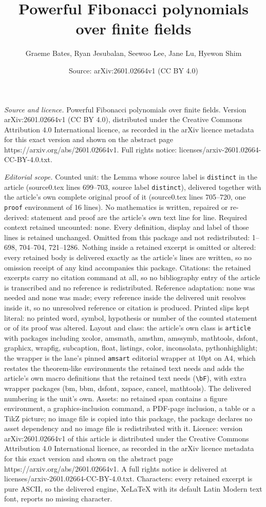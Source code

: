 \documentclass[10pt,a4paper]{amsart}
\title[Powerful Fibonacci polynomials over finite fields]{Powerful Fibonacci polynomials over finite fields}
\author{Graeme Bates, Ryan Jesubalan, Seewoo Lee, Jane Lu, Hyewon Shim}
\date{Source: arXiv:2601.02664v1 (CC BY 4.0)}
\begin{document}
\maketitle

\noindent\emph{Source and licence.} Powerful Fibonacci polynomials over finite fields. Version arXiv:2601.02664v1 (CC BY 4.0), distributed under the Creative Commons Attribution 4.0 International licence, as recorded in the arXiv licence metadata for this exact version and shown on the abstract page https://arxiv.org/abs/2601.02664v1. Full rights notice: licenses/arxiv-2601.02664-CC-BY-4.0.txt.\par\smallskip

\noindent\textit{Editorial scope.} Counted unit: the Lemma whose source label is \texttt{distinct} in the article (source0.tex lines 699--703, source label \texttt{distinct}), delivered together with the article's own complete original proof of it (source0.tex lines 705--720, one \texttt{proof} environment of 16 lines). No mathematics is written, repaired or re-derived: statement and proof are the article's own text line for line. Required context retained uncounted: none. Every definition, display and label of those lines is retained unchanged. Omitted from this package and not redistributed: 1--698, 704--704, 721--1286. Nothing inside a retained excerpt is omitted or altered: every retained body is delivered exactly as the article's lines are written, so no omission receipt of any kind accompanies this package. Citations: the retained excerpts carry no citation command at all, so no bibliography entry of the article is transcribed and no reference is redistributed. Reference adaptation: none was needed and none was made; every reference inside the delivered unit resolves inside it, so no unresolved reference or citation is produced. Printed slips kept literal: no printed word, symbol, hypothesis or number of the counted statement or of its proof was altered. Layout and class: the article's own class is \texttt{article} with packages including xcolor, amsmath, amsthm, amssymb, mathtools, dsfont, graphicx, wrapfig, subcaption, float, listings, color, inconsolata, pythonhighlight; the wrapper is the lane's pinned \texttt{amsart} editorial wrapper at 10pt on A4, which restates the theorem-like environments the retained text needs and adds the article's own macro definitions that the retained text needs (\texttt{\textbackslash bF}), with extra wrapper packages (bm, bbm, dsfont, xspace, cancel, mathtools). The delivered numbering is the unit's own. Assets: no retained span contains a figure environment, a graphics-inclusion command, a PDF-page inclusion, a table or a TikZ picture; no image file is copied into this package, the package declares no asset dependency and no image file is redistributed with it. Licence: version arXiv:2601.02664v1 of this article is distributed under the Creative Commons Attribution 4.0 International licence, as recorded in the arXiv licence metadata for this exact version and shown on the abstract page https://arxiv.org/abs/2601.02664v1. A full rights notice is delivered at licenses/arxiv-2601.02664-CC-BY-4.0.txt. Characters: every retained excerpt is pure ASCII, so the delivered engine, XeLaTeX with its default Latin Modern text font, reports no missing character.
\end{document}
